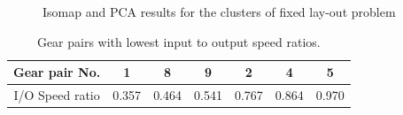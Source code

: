 \begin{figure}[ht]\begin{center}
 \caption{Isomap and PCA results for the clusters of fixed lay-out problem}
 \label{gt11clustersVar}
\end{center}\end{figure}


\begin{table}[!ht]
  \centering
  \begin{tabular}{|c|c|c|c|c|c|c|}
    \hline
    Gear pair No. & 1 & 8 & 9 & 2 & 4 & 5 \\
    \hline
    I/O Speed ratio & 0.357 & 0.464 & 0.541 & 0.767 & 0.864 & 0.970 \\
    \hline
  \end{tabular}
  \caption{Gear pairs with lowest input to output speed ratios.}
  \label{iosRatio}
\end{table}



